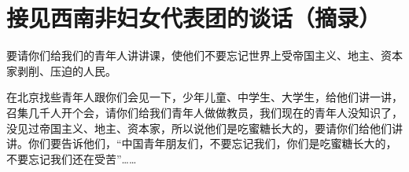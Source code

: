 \section[接见西南非妇女代表团的谈话（摘录）（一九六四年十月）]{接见西南非妇女代表团的谈话（摘录）}


要请你们给我们的青年人讲讲课，使他们不要忘记世界上受帝国主义、地主、资本家剥削、压迫的人民。

在北京找些青年人跟你们会见一下，少年儿童、中学生、大学生，给他们讲一讲，召集几千人开个会，请你们给我们青年人做做教员，我们现在的青年人没知识了，没见过帝国主义、地主、资本家，所以说他们是吃蜜糖长大的，要请你们给他们讲讲。你们要告诉他们，“中国青年朋友们，不要忘记我们，你们是吃蜜糖长大的，不要忘记我们还在受苦”……


